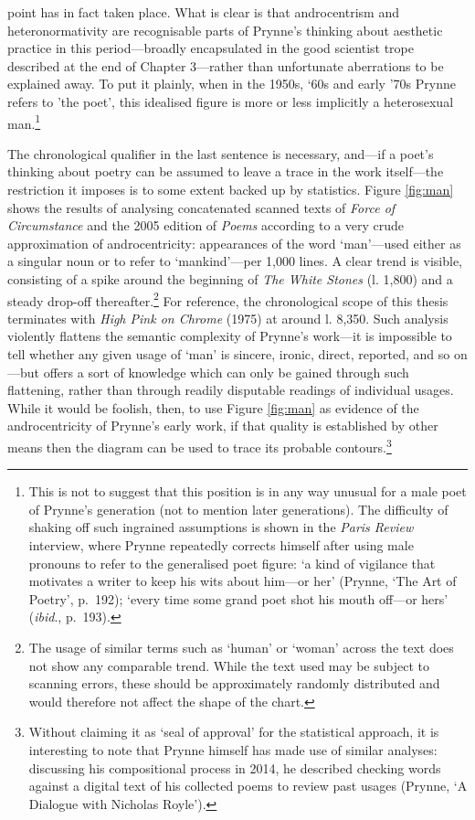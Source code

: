 \documentclass[]{article}
\begin{document}
point has in fact taken place. What is clear is that androcentrism and
heteronormativity are recognisable parts of Prynne’s thinking about
aesthetic practice in this period—broadly encapsulated in the good
scientist trope described at the end of Chapter 3—rather than
unfortunate aberrations to be explained away. To put it plainly, when in
the 1950s, ‘60s and early ’70s Prynne refers to ’the poet’, this
idealised figure is more or less implicitly a heterosexual
man.\footnote{This is not to suggest that this position is in any way
  unusual for a male poet of Prynne’s generation (not to mention later
  generations). The difficulty of shaking off such ingrained assumptions
  is shown in the \emph{Paris Review} interview, where Prynne repeatedly
  corrects himself after using male pronouns to refer to the generalised
  poet figure: ‘a kind of vigilance that motivates a writer to keep his
  wits about him—or her’ (Prynne, ‘The Art of Poetry’, p.~192); ‘every
  time some grand poet shot his mouth off—or hers’ (\emph{ibid}.,
  p.~193).}

The chronological qualifier in the last sentence is necessary, and—if a
poet’s thinking about poetry can be assumed to leave a trace in the work
itself—the restriction it imposes is to some extent backed up by
statistics. Figure \ref{fig:man} shows the results of analysing
concatenated scanned texts of \emph{Force of Circumstance} and the 2005
edition of \emph{Poems} according to a very crude approximation of
androcentricity: appearances of the word ‘man’—used either as a singular
noun or to refer to ‘mankind’—per 1,000 lines. A clear trend is visible,
consisting of a spike around the beginning of \emph{The White Stones}
(l. 1,800) and a steady drop-off thereafter.\footnote{The usage of
  similar terms such as ‘human’ or ‘woman’ across the text does not show
  any comparable trend. While the text used may be subject to scanning
  errors, these should be approximately randomly distributed and would
  therefore not affect the shape of the chart.} For reference, the
chronological scope of this thesis terminates with \emph{High Pink on
Chrome} (1975) at around l. 8,350. Such analysis violently flattens the
semantic complexity of Prynne’s work—it is impossible to tell whether
any given usage of ‘man’ is sincere, ironic, direct, reported, and so
on—but offers a sort of knowledge which can only be gained through such
flattening, rather than through readily disputable readings of
individual usages. While it would be foolish, then, to use Figure
\ref{fig:man} as evidence of the androcentricity of Prynne’s early work,
if that quality is established by other means then the diagram can be
used to trace its probable contours.\footnote{Without claiming it as
  ‘seal of approval’ for the statistical approach, it is interesting to
  note that Prynne himself has made use of similar analyses: discussing
  his compositional process in 2014, he described checking words against
  a digital text of his collected poems to review past usages (Prynne,
  ‘A Dialogue with Nicholas Royle’).}
\end{document}
